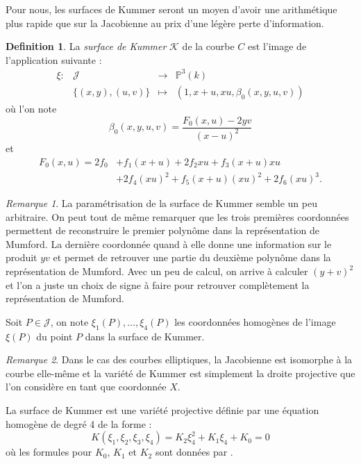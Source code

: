 \documentclass[a4paper,12pt]{article}
\theoremstyle{definition}
\newtheorem{definition}{Definition}[section]
\theoremstyle{remark}
\newtheorem{remarque}{Remarque}
\numberwithin{equation}{section}
\begin{document}
Pour nous, les surfaces de Kummer seront un moyen d'avoir une arithmétique plus rapide que sur la Jacobienne au prix d'une légère perte d'information.

\begin{definition}
La \emph{surface de Kummer} $\mathcal{K}$ de la courbe $C$ est l'image de l'application suivante :
\begin{equation*}
\begin{array}{lrcl}
\xi : &\mathcal{J} & \longrightarrow & \mathbb{P}^3(k) \\
& \{(x,y),(u,v)\} & \longmapsto & (1,x+u,xu,\beta_0(x,y,u,v))
\end{array}
\end{equation*}
où l'on note
$$\beta_0(x,y,u,v) = \frac{F_0(x,u)-2yv}{(x-u)^2}$$
et
\begin{align*}
F_0(x,u)=2f_0&+f_1(x+u)+2f_2xu+f_3(x+u)xu \\
&+2f_4(xu)^2+f_5(x+u)(xu)^2+2f_6(xu)^3.
\end{align*}
\end{definition}

\begin{remarque}
La paramétrisation de la surface de Kummer semble un peu arbitraire. On peut tout de même remarquer que les trois premières coordonnées permettent de reconstruire le premier polynôme dans la représentation de Mumford. La dernière coordonnée quand à elle donne une information sur le produit $yv$ et permet de retrouver une partie du deuxième polynôme dans la représentation de Mumford. Avec un peu de calcul, on arrive à calculer $(y+v)^2$ et l'on a juste un choix de signe à faire pour retrouver complètement la représentation de Mumford.
\end{remarque}

Soit $P \in \mathcal{J}$, on note $\xi_1(P),...,\xi_4(P)$ les coordonnées homogènes de l'image $\xi(P)$ du point $P$ dans la surface de Kummer.

\begin{remarque}
Dans le cas des courbes elliptiques, la Jacobienne est isomorphe à la courbe elle-même et la variété de Kummer est simplement la droite projective que l'on considère en tant que coordonnée $X$.
\end{remarque}

La surface de Kummer est une variété projective définie par une équation homogène de degré 4 de la forme :
$$K(\xi_1,\xi_2,\xi_3,\xi_4)=K_2\xi_4^2 + K_1\xi_4 + K_0 = 0$$
où les formules pour $K_0$, $K_1$ et $K_2$ sont données par \citet{eqKum}.
\end{document}
